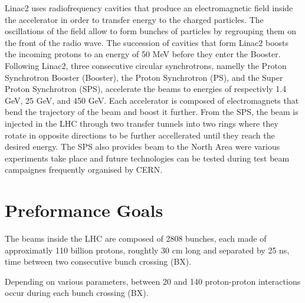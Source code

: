     Linac2 uses radiofrequency cavities that produce an electromagnetic field inside the accelerator in order to transfer energy to the charged particles. The oscillations of the field allow to form bunches of particles by regrouping them on the front of the radio wave. The succession of cavities that form Linac2 boosts the incoming protons to an energy of 50 MeV before they enter the Booster. \\

    Following Linac2, three consecutive circular synchrotrons, namelly the Proton Synchrotron Booster (Booster), the Proton Synchrotron (PS), and the Super Proton Synchrotron (SPS), accelerate the beams to energies of respectivly 1.4 GeV, 25 GeV, and 450 GeV. Each accelerator is composed of electromagnets that bend the trajectory of the beam and boost it further. From the SPS, the beam is injected in the LHC through two transfer tunnels into two rings where they rotate in opposite directions to be further accellerated until they reach the desired energy. The SPS also provides beam to the North Area were various experiments take place and future technologies can be tested during test beam campaignes frequently organised by CERN.

	\section{Preformance Goals}

  	The beams inside the LHC are composed of 2808 bunches, each made of approximatly 110 billion protons, roughtly 30 cm long and separated by 25 ns, time between two consecutive bunch crossing (BX).

    Depending on various parameters, between 20 and 140 proton-proton interactions occur during each bunch crossing (BX).

